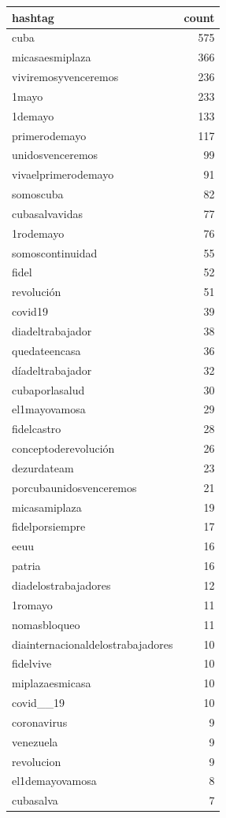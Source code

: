 \begin{tabular}{lr}
\toprule
hashtag & count \\
\midrule
cuba & 575 \\
micasaesmiplaza & 366 \\
viviremosyvenceremos & 236 \\
1mayo & 233 \\
1demayo & 133 \\
primerodemayo & 117 \\
unidosvenceremos & 99 \\
vivaelprimerodemayo & 91 \\
somoscuba & 82 \\
cubasalvavidas & 77 \\
1rodemayo & 76 \\
somoscontinuidad & 55 \\
fidel & 52 \\
revolución & 51 \\
covid19 & 39 \\
diadeltrabajador & 38 \\
quedateencasa & 36 \\
díadeltrabajador & 32 \\
cubaporlasalud & 30 \\
el1mayovamosa & 29 \\
fidelcastro & 28 \\
conceptoderevolución & 26 \\
dezurdateam & 23 \\
porcubaunidosvenceremos & 21 \\
micasamiplaza & 19 \\
fidelporsiempre & 17 \\
eeuu & 16 \\
patria & 16 \\
diadelostrabajadores & 12 \\
1romayo & 11 \\
nomasbloqueo & 11 \\
diainternacionaldelostrabajadores & 10 \\
fidelvive & 10 \\
miplazaesmicasa & 10 \\
covid\_\_19 & 10 \\
coronavirus & 9 \\
venezuela & 9 \\
revolucion & 9 \\
el1demayovamosa & 8 \\
cubasalva & 7 \\

\end{tabular}
